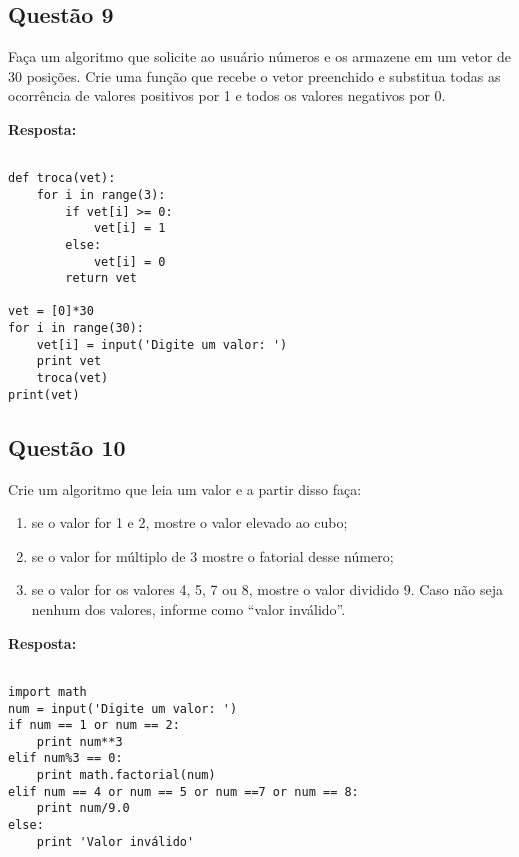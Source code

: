 \documentclass[a4paper, 12pt, onecolumn,singlespacing]{article}
\begin{document}
\subsection{Questão 9}
	
	Faça um algoritmo que solicite ao usuário números e os armazene em um vetor de 30 posições. Crie uma função que recebe o vetor preenchido e substitua todas as ocorrência de valores positivos por 1 e todos os valores negativos por 0.
	
	\textbf{Resposta:}
	
\begin{verbatim}

def troca(vet):
	for i in range(3):
		if vet[i] >= 0:
			vet[i] = 1
		else:
			vet[i] = 0
		return vet
	
vet = [0]*30
for i in range(30):
	vet[i] = input('Digite um valor: ')
	print vet
	troca(vet)
print(vet)

\end{verbatim}
	
\subsection{Questão 10}

Crie um algoritmo que leia um valor e a partir disso faça: 
\begin{enumerate}
	\item se o valor for 1 e 2, mostre o valor elevado ao cubo;
	\item se o valor for múltiplo de 3 mostre o fatorial desse número;
	\item se o valor for os valores 4, 5, 7 ou 8, mostre o valor dividido 9. Caso não seja nenhum dos valores, informe como “valor inválido”.
\end{enumerate}

\textbf{Resposta:}

\begin{verbatim}
	
import math
num = input('Digite um valor: ')
if num == 1 or num == 2:
	print num**3
elif num%3 == 0:
	print math.factorial(num)
elif num == 4 or num == 5 or num ==7 or num == 8:
	print num/9.0
else:
	print 'Valor inválido'
	
\end{verbatim}
\end{document}
